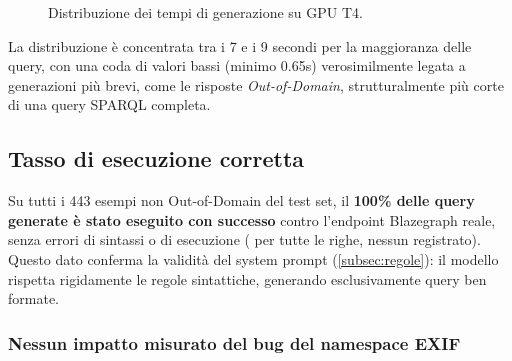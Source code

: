 \begin{figure}[htbp]
    \centering
    \caption{Distribuzione dei tempi di generazione su GPU T4.}\label{fig:generation_time_hist}
\end{figure}

La distribuzione è concentrata tra i 7 e i 9 secondi per la maggioranza delle query, con una coda di valori bassi (minimo 0.65s) verosimilmente legata a generazioni più brevi, come le risposte \textit{Out-of-Domain}, strutturalmente più corte di una query SPARQL completa.

\subsection{Tasso di esecuzione corretta}\label{subsec:tasso_esecuzione}

Su tutti i 443 esempi non Out-of-Domain del test set, il \textbf{100\% delle query generate è stato eseguito con successo} contro l'endpoint Blazegraph reale, senza errori di sintassi o di esecuzione ( per tutte le righe, nessun  registrato). Questo dato conferma la validità del system prompt (\cref{subsec:regole}): il modello rispetta rigidamente le regole sintattiche, generando esclusivamente query ben formate.

\subsubsection{Nessun impatto misurato del bug del namespace EXIF}

